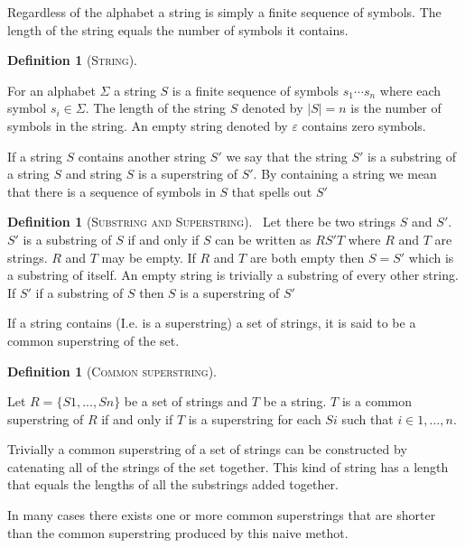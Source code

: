 \documentclass[english,twoside,censored,csm,algorithms-track-2020]{HYthesisML}
\theoremstyle{plain}
\theoremstyle{definition}
\newtheorem{definition}[theorem]{Definition}
\begin{document}
Regardless of the alphabet a string is simply a finite sequence of symbols. The length of the string equals the number of symbols it contains. 

\begin{definition}[\textsc{String}]~\label{def-string}
  
  For an alphabet $\Sigma$ a string $S$ is a finite sequence of symbols  ${s_1\cdots s_n}$ where each symbol $s_i \in \Sigma$.
  The length of the string $S$ denoted by $|S| = n$ is the number of symbols in the string.
  An empty string denoted by $\varepsilon$ contains zero symbols.
  
\end{definition}

If a string $S$ contains another string $S'$ we say that the string $S'$ is a substring of a string $S$ and string $S$ is a superstring of $S'$.
By containing a string we mean that there is a sequence of symbols in $S$ that spells out $S'$

\begin{definition}[\textsc{Substring and Superstring}]~\label{def-sub-super}
  Let there be two strings $S$ and $S'$.
  $S'$ is a substring of $S$ if and only if $S$ can be written as $RS'T$ where $R$ and $T$ are strings. $R$ and $T$ may be empty.
  If $R$ and $T$ are both empty then $S = S'$ which is a substring of itself.
  An empty string is trivially a substring of every other string.\\

  If $S'$ if a substring of $S$ then $S$ is a superstring of $S'$
\end{definition}

If a string contains (I.e. is a superstring) a set of strings, it is said to be a common superstring of the set.

\begin{definition}[\textsc{Common superstring}]~\label{def-cs}

  Let $R = \{S1,...,Sn\}$ be a set of strings and $T$ be a string.
  $T$ is a common superstring of $R$ if and only if $T$ is a superstring for each $Si$ such that $i\in 1,...,n$.
  
\end{definition}

Trivially a common superstring of a set of strings can be constructed by catenating all of the strings of the set together.
This kind of string has a length that equals the lengths of all the substrings added together.

In many cases there exists one or more common superstrings that are shorter than the common superstring produced by this naive methot.
\end{document}
